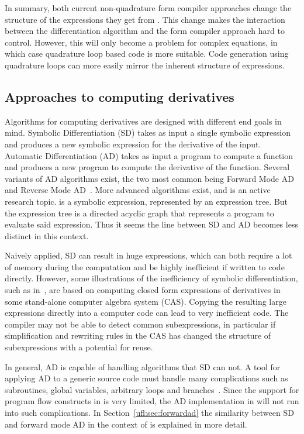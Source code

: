 In summary, both current non-quadrature form compiler approaches
change the structure of the expressions they get from \ufl{}.  This
change makes the interaction between the differentiation algorithm and
the form compiler approach hard to control.  However, this will only
become a problem for complex equations, in which case quadrature loop
based code is more suitable.  Code generation using quadrature loops
can more easily mirror the inherent structure of \ufl{} expressions.

\subsection{Approaches to computing derivatives} \label{ufl:sec:appcompder}

Algorithms for computing derivatives are designed with different end
goals in mind.  Symbolic Differentiation (SD) takes as input a single
symbolic expression and produces a new symbolic expression for the
derivative of the input.  Automatic Differentiation (AD) takes as
input a program to compute a function and produces a new program to
compute the derivative of the function.  Several variants of AD
algorithms exist, the two most common being Forward Mode AD and
Reverse Mode AD~\cite{Gri1989}.  More advanced algorithms exist, and
is an active research topic.%
is a symbolic expression, represented by an expression tree. But the
expression tree is a directed acyclic graph that represents a program
to evaluate said expression.  Thus it seems the line between SD and AD
becomes less distinct in this context.

Naively applied, SD can result in huge expressions, which can both
require a lot of memory during the computation and be highly
inefficient if written to code directly. However, some illustrations
of the inefficiency of symbolic differentiation, such as
in~\cite{Gri1989}, are based on computing closed form expressions of
derivatives in some stand-alone computer algebra system (CAS).
Copying the resulting large expressions directly into a computer code
can lead to very inefficient code. The compiler may not be able to
detect common subexpressions, in particular if simplification and
rewriting rules in the CAS has changed the structure of subexpressions
with a potential for reuse.

In general, AD is capable of handling algorithms that SD can not.  A
tool for applying AD to a generic source code must handle many
complications such as subroutines, global variables, arbitrary loops
and branches~\cite{BisCar1992,BisHov2002,GieKam1998}.  Since the
support for program flow constructs in \ufl{} is very limited, the AD
implementation in \ufl{} will not run into such complications.  In
Section~\ref{ufl:sec:forwardad} the similarity between SD and forward
mode AD in the context of \ufl{} is explained in more detail.

